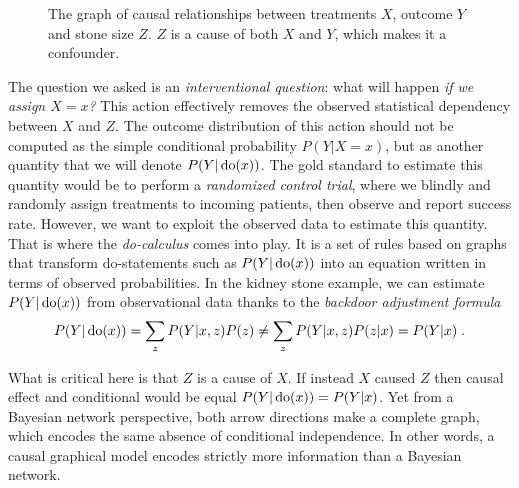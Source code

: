 \begin{figure}
    \centering
    \caption{The graph of causal relationships between treatments $X$, outcome $Y$ and stone size $Z$. $Z$ is a cause of both $X$ and $Y$, which makes it a confounder.}
    \label{fig:simpsons_paradox}
\end{figure}

The question we asked is an \textit{interventional question}: what will happen \textit{if we assign $X=x$?} This action effectively removes the observed statistical dependency between $X$ and $Z$. The outcome distribution of this action should not be computed as the simple conditional probability $P(Y|X=x)$, but as another quantity that we will denote $P(Y| \operatorname{\mathrm{do}}(x))$. The gold standard to estimate this quantity would be to perform a \textit{randomized control trial}, where we blindly and randomly assign treatments to incoming patients, then observe and report success rate. However, we want to exploit the observed data to estimate this quantity. That is where the \textit{do-calculus} comes into play. It is a set of rules based on graphs that transform do-statements such as $P(Y| \operatorname{\mathrm{do}}(x))$ into an equation written in terms of observed probabilities.
In the kidney stone example, we can estimate $P(Y| \operatorname{\mathrm{do}}(x))$ from observational data thanks to the \textit{backdoor adjustment formula}
\begin{align}
	P(Y|\operatorname{\mathrm{do}}(x)) = \sum_z P(Y | x, z) P(z)
	\neq \sum_z P(Y | x, z) P(z|x) = P(Y | x) \; .
	\label{eq:backdoor_adjustment}
\end{align}

What is critical here is that $Z$ is a cause of $X$. If instead $X$ caused $Z$ then causal effect and conditional would be equal $P(Y|\operatorname{\mathrm{do}}(x)) = P(Y | x)$. Yet from a Bayesian network perspective, both arrow directions make a complete graph, which encodes the same absence of conditional independence. In other words, a causal graphical model encodes strictly more information than a Bayesian network.

